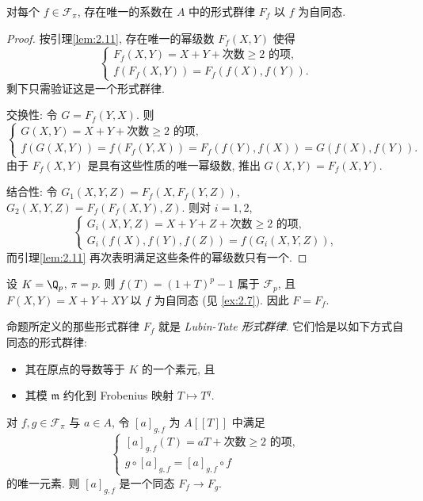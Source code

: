 \begin{proposition}\label{prop:2.12}
对每个 $f\in\mathcal{F}_{\pi}$, 存在唯一的系数在 $A$ 中的形式群律 $F_f$ 以 $f$ 为自同态.
\end{proposition}

\begin{proof}
按引理\ref{lem:2.11}, 存在唯一的幂级数 $F_f(X,Y)$ 使得
\[
\begin{cases}
F_f(X,Y)=X+Y+\text{次数}\ge 2\text{ 的项},\\
f(F_f(X,Y))=F_f(f(X),f(Y)).
\end{cases}
\]
剩下只需验证这是一个形式群律.

交换性: 令 $G=F_f(Y,X)$. 则
\[
\begin{cases}
G(X,Y)=X+Y+\text{次数}\ge 2\text{ 的项},\\
f(G(X,Y))=f(F_f(Y,X))=F_f(f(Y),f(X))=G(f(X),f(Y)).
\end{cases}
\]
由于 $F_f(X,Y)$ 是具有这些性质的唯一幂级数, 推出 $G(X,Y)=F_f(X,Y)$.

结合性: 令 $G_1(X,Y,Z)=F_f(X,F_f(Y,Z))$, $G_2(X,Y,Z)=F_f(F_f(X,Y),Z)$. 则对 $i=1,2$,
\[
\begin{cases}
G_i(X,Y,Z)=X+Y+Z+\text{次数}\ge 2\text{ 的项},\\
G_i(f(X),f(Y),f(Z))=f(G_i(X,Y,Z)),
\end{cases}
\]
而引理\ref{lem:2.11} 再次表明满足这些条件的幂级数只有一个.
\end{proof}

\begin{example}\label{ex:2.13}
设 $K=\Q_p$, $\pi=p$. 则 $f(T)=(1+T)^p-1$ 属于 $\mathcal{F}_p$, 且 $F(X,Y)=X+Y+XY$ 以 $f$ 为自同态 (见 \ref{ex:2.7}). 因此 $F=F_f$.
\end{example}

命题所定义的那些形式群律 $F_f$ 就是 \emph{Lubin-Tate 形式群律}. 它们恰是以如下方式自同态的形式群律:

\begin{itemize}
\item 其在原点的导数等于 $K$ 的一个素元, 且
\item 其模 $\mathfrak{m}$ 约化到 Frobenius 映射 $T\mapsto T^q$.
\end{itemize}

\begin{proposition}\label{prop:2.14}
对 $f,g\in\mathcal{F}_{\pi}$ 与 $a\in A$, 令 $[a]_{g,f}$ 为 $A[[T]]$ 中满足
\[
\begin{cases}
[a]_{g,f}(T)=aT+\text{次数}\ge 2\text{ 的项},\\
g\circ[a]_{g,f}=[a]_{g,f}\circ f
\end{cases}
\]
的唯一元素. 则 $[a]_{g,f}$ 是一个同态 $F_f\to F_g$.
\end{proposition}

